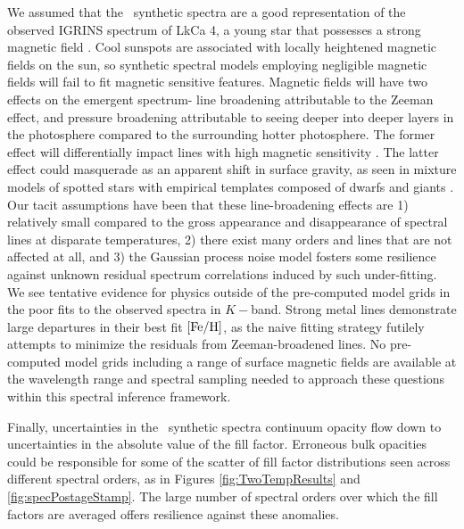 \documentclass[twocolumn]{emulateapj}%
\begin{document}
We assumed that the \PHOENIX\ synthetic spectra are a good representation of the observed IGRINS spectrum of LkCa 4, a young star that possesses a strong magnetic field \citep{donati14}.  Cool sunspots are associated with locally heightened magnetic fields on the sun, so synthetic spectral models employing negligible magnetic fields will fail to fit magnetic sensitive features.  Magnetic fields will have two effects on the emergent spectrum- line broadening attributable to the Zeeman effect, and pressure broadening attributable to seeing deeper into deeper layers in the photosphere compared to the surrounding hotter photosphere.  The former effect will differentially impact lines with high magnetic sensitivity \citep[\emph{e.g.}][]{johnskrull99,deen13}.  The latter effect could masquerade as an apparent shift in surface gravity, as seen in mixture models of spotted stars with empirical templates composed of dwarfs and giants \citep{oneal96}.  Our tacit assumptions have been that these line-broadening effects are 1) relatively small compared to the gross appearance and disappearance of spectral lines at disparate temperatures, 2) there exist many orders and lines that are not affected at all, and 3) the Gaussian process noise model fosters some resilience against unknown residual spectrum correlations induced by such under-fitting.  We see tentative evidence for physics outside of the pre-computed model grids in the poor fits to the observed spectra in $K-$band.  Strong metal lines demonstrate large departures in their best fit $[{\rm Fe}/{\rm H}]$, as the na\:ive fitting strategy futilely attempts to minimize the residuals from Zeeman-broadened lines.  No pre-computed model grids including a range of surface magnetic fields are available at the wavelength range and spectral sampling needed to approach these questions within this spectral inference framework.

Finally, uncertainties in the \PHOENIX\ synthetic spectra continuum opacity flow down to uncertainties in the absolute value of the fill factor.  Erroneous bulk opacities could be responsible for some of the scatter of fill factor distributions seen across different spectral orders, as in Figures \ref{fig:TwoTempResults} and \ref{fig:specPostageStamp}.  The large number of spectral orders over which the fill factors are averaged offers resilience against these anomalies.
\end{document}
